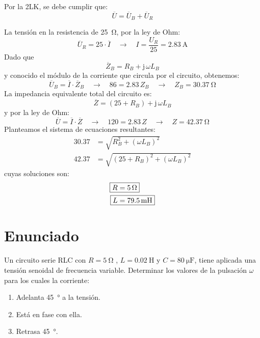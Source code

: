 Por la 2LK, se debe cumplir que:
\begin{equation*}
  \overline{U} = \overline{U}_B + \overline{U}_R
\end{equation*}


La tensión en la resistencia de \qty{25}{\ohm}, por la ley de Ohm:
\begin{equation*}
  \overline{U}_R = 25 \cdot \overline{I} \quad \rightarrow \quad I = \frac{U_R}{25} = \qty{2.83}{\ampere}
\end{equation*}
Dado que
\begin{equation*}
  \overline{Z}_B = R_B + \mathrm{j}\,\omega L_B
\end{equation*}
y conocido el módulo de la corriente que circula por el circuito, obtenemos:
\begin{equation*}
  \overline{U}_B = \overline{I} \cdot \overline{Z}_B \quad \rightarrow \quad 86 = 2.83 \, Z_B \quad \rightarrow \quad Z_B = \qty{30.37}{\ohm}
\end{equation*}
La impedancia equivalente total del circuito es:
\begin{equation*}
  \overline{Z} = (25 + R_B) + \mathrm{j}\,\omega L_B
\end{equation*}
y por la ley de Ohm:
\begin{equation*}
  \overline{U} = \overline{I} \cdot \overline{Z} \quad \rightarrow \quad 120 = 2.83 \, Z \quad \rightarrow \quad Z = \qty{42.37}{\ohm}
\end{equation*}
Planteamos el sistema de ecuaciones resultantes:
\begin{align*}
  30.37 &= \sqrt{R^2_B + (\omega L_B)^2}\\
  42.37 &= \sqrt{(25 + R_B)^2 + (\omega L_B)^2}
\end{align*}
cuyas soluciones son:
\begin{align*}
  \Aboxed{R &= \qty{5}{\ohm}}\\
  \Aboxed{L &= \qty{79.5}{\milli\henry}}
\end{align*}


\section{Enunciado}
Un circuito serie RLC con $R = \qty{5}{\ohm}$ , $L = \qty{0.02}{\henry}$ y $C=\qty{80}{\micro\farad}$, tiene aplicada una tensión senoidal de frecuencia variable. Determinar los valores de la pulsación $\omega$ para los cuales la corriente:
\begin{enumerate}
\item Adelanta \qty{45}{\degree} a la tensión.
\item Está en fase con ella.
\item Retrasa \qty{45}{\degree}.
\end{enumerate}

